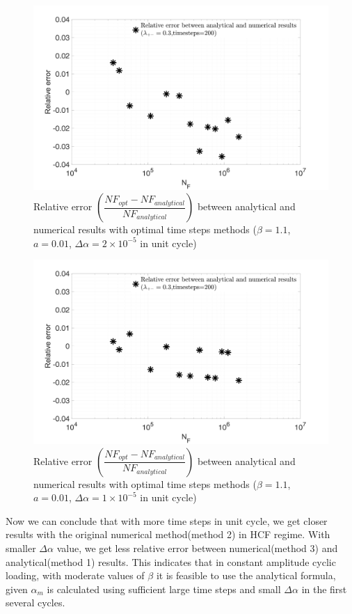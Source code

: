 \begin{figure}[!h]
	\centering
	\includegraphics[width=\textwidth]{figures//SN_opt_ana_200_delta_alp=0.00002_err.png} 
	\caption{Relative error $\left( \dfrac{NF_{opt}-NF_{analytical}}{NF_{analytical}}\right)$  between analytical and numerical results with optimal time steps methods ($\beta=1.1$, $a=0.01$, $\Delta \alpha=2\times10^{-5}$ in unit cycle)}	
	\label{fig.errorNumAna0.02}
\end{figure}
\begin{figure}[!h]
	\centering
	\includegraphics[width=\textwidth]{figures//SN_opt_ana_200_delta_alp=0.00001_err.png} 
	\caption{Relative error $\left(\dfrac{NF_{opt}-NF_{analytical}}{NF_{analytical}}\right)$  between analytical and numerical results with optimal time steps methods ($\beta=1.1$, $a=0.01$, $\Delta \alpha=1\times10^{-5}$ in unit cycle)}
	\label{fig.errorNumAna0.01}
\end{figure}

Now we can conclude that with more time steps in unit cycle, we get closer results with the original numerical method(method 2) in HCF regime. With smaller $\Delta \alpha$ value, we get less relative error between numerical(method 3) and analytical(method 1) results. This indicates that in constant amplitude cyclic loading, with moderate values of $\beta$ it is feasible to use the analytical formula, given $\alpha_m$ is calculated using sufficient large time steps and small $\Delta \alpha$ in the first several cycles.

